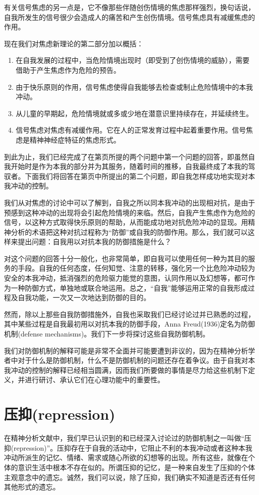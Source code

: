 \documentclass[UTF8,10pt,a4paper,openany]{book}
\begin{document}
有关信号焦虑的另一点是，它不像那些伴随创伤情境的焦虑那样强烈，换句话说，自我所发生的信号很少会造成人的痛苦和产生创伤情境。信号焦虑具有减缓焦虑的作用。

现在我们对焦虑新理论的第二部分加以概括：
\begin{enumerate}
    \item 在自我发展的过程中，当危险情境出现时（即受到了创伤情境的威胁），需要借助于产生焦虑作为危险的预告。
    \item 由于快乐原则的作用，信号焦虑使得自我能够去检查或制止危险情境中的本我冲动。
    \item 从儿童的早期起，危险情境就或多或少地在潜意识里持续存在，并延续终生。
    \item 信号焦虑对焦虑有减缓作用。它在人的正常发育过程中起着重要作用。信号焦虑是精神神经症特征的焦虑形式。
\end{enumerate}

到此为止，我们已经完成了在第\pageref{label1}页所提的两个问题中第一个问题的回答，即虽然自我开始时是作为本我的部分并为其服务，随着时间的推移，自我最终成了本我的驾驭者。下面我们将回答在第\pageref{label1}页中所提出的第二个问题，即自我怎样成功地实现对本我冲动的控制。

我们从对焦虑的讨论中可以了解到，自我之所以同本我冲动的出现相对抗，是由于预感到这种冲动的出现将会引起危险情境的来临。然后，自我产生焦虑作为危险的信号，以这种方式取得快乐原则的帮助，从而能成功地对抗危险冲动的显现。用精神分析的术语把这种对抗过程称为“防御”或自我的防御作用。那么，我们就可以这样来提出问题：自我用以对抗本我的防御措施是什么？

对这个问题的回答十分一般化，也非常简单，即自我可以使用任何一种为其目的服务的手段。自我的任何态度，任何知觉、注意的转移，强化另一个比危险冲动较为安全的本我冲动，抵消强烈的危险驱力能觉的意图，认同作用以及幻想等，都可作为一种防御方式，单独地或联合地运用。总之，“自我”能够运用正常的自我形成过程及自我功能，一次又一次地达到防御的目的。

然而，除以上那些自我防御措施外，自我也采取我们已经讨论过并已熟悉的过程，其中某些过程是自我最初用以对抗本我的防御手段，Anna Freud(1936)定名为防御机制(defense mechanisms)。我们下一步将探讨这些自我防御机制。

我们对防御机制的解释可能是非常不全面并可能要遭到非议的，因为在精神分析学者中对于什么是防御机制，什么不是防御机制的问题还存在着争议。由于自我对本我冲动的控制的解释已经相当圆满，因而我们所要做的事情是尽力给这些机制下定义，并进行研讨、承认它们在心理功能中的重要性。

\section*{压抑(repression)}
在精神分析文献中，我们早已认识到的和已经深入讨论过的防御机制之一叫做“压抑(repression)”。压抑存在于自我的活动中，它阻止不利的本我冲动或者这种本我冲动所派生的记忆、情绪、需求或随心所欲的幻想等的出现。所有这些，就像在个体的意识生活中根本不存在似的。所谓压抑的记忆，是一种来自发生了压抑的个体主观意念中的遗忘。诚然，我们可以说，除了压抑，我们确实不知道是否还有任何其他形式的遗忘。
\end{document}

